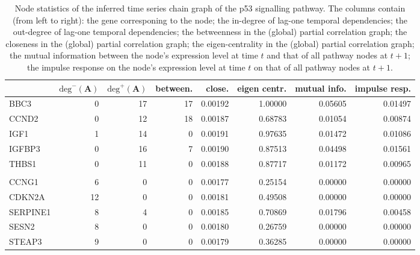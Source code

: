 \begin{table}[b!] \label{table:postEst}
\scriptsize
\begin{center}
\begin{tabular}{lrrrrrrr}
\hline
&	$\mbox{deg}^- (\mathbf{A})$	&	$\mbox{deg}^+ (\mathbf{A})$	&	between. 	&	close.	&	eigen centr.	&	mutual info.	&	impulse resp.	\\
\hline
BBC3	&	0	&	17	&	17	&	0.00192	&	1.00000	&	0.05605	&	0.01497	\\
CCND2	&	0	&	12	&	18	&	0.00187	&	0.68783	&	0.01054	&	0.00874	\\
IGF1	&	1	&	14	&	0	&	0.00191	&	0.97635	&	0.01472	&	0.01086	\\
IGFBP3	&	0	&	16	&	7	&	0.00190	&	0.87513	&	0.04498	&	0.01561	\\
THBS1	&	0	&	11	&	0	&	0.00188	&	0.87717	&	0.01172	&	0.00965	\\
	&		&		&		&		&		&		&		\\
CCNG1	&	6	&	0	&	0	&	0.00177	&	0.25154	&	0.00000	&	0.00000	\\
CDKN2A	&	12	&	0	&	0	&	0.00181	&	0.49508	&	0.00000	&	0.00000	\\
SERPINE1	&	8	&	4	&	0	&	0.00185	&	0.70869	&	0.01796	&	0.00458	\\
SESN2	&	8	&	0	&	0	&	0.00180	&	0.26759	&	0.00000	&	0.00000	\\
STEAP3	&	9	&	0	&	0	&	0.00179	&	0.36285	&	0.00000	&	0.00000	\\
\hline
\end{tabular}
\end{center}
\caption{Node statistics of the inferred time series chain graph of the p53 signalling pathway. The columns contain (from left to right): the gene corresponing to the node; the in-degree of lag-one temporal dependencies; the out-degree of lag-one temporal dependencies; the betweenness in the (global) partial correlation graph; the closeness in the (global) partial correlation graph; the eigen-centrality in the (global) partial correlation graph; the mutual information between the node's expression level at time $t$ and that of all pathway nodes at $t+1$; the impulse response on the node's expression level at time $t$ on that of all pathway nodes at $t+1$.}
\end{table}



